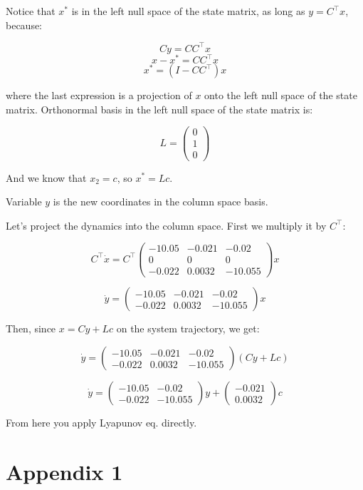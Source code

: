 \documentclass[12pt]{article}%
\begin{document}
Notice that $x^*$ is in the left null space of the state matrix, as long as $y = C^{\top}x$, because: 

$$Cy = CC^{\top}x$$
$$x-x^* = CC^{\top}x$$
$$x^* = (I-CC^{\top})x$$

where the last expression is a projection of $x$ onto the left null space of the state matrix. Orthonormal basis in the left null space of the state matrix is:

$$
L =
\begin{pmatrix} 
0 \\  
1 \\  
0
\end{pmatrix}
$$

And we know that $x_2 = c$, so $x^* = Lc$.

Variable $y$ is the new coordinates in the column space basis.

Let's project the dynamics into the column space. First we multiply it by $C^{\top}$:

$$C^{\top} \dot x = 
C^{\top}
\begin{pmatrix} -10.05 & -0.021 & -0.02 \\  
0 & 0 & 0 \\  
-0.022 & 0.0032 & -10.055
\end{pmatrix}
x
$$

$$\dot y = 
\begin{pmatrix} -10.05 & -0.021 & -0.02 \\ 
-0.022 & 0.0032 & -10.055
\end{pmatrix}
x
$$

Then, since $x = Cy + Lc$ on the system trajectory, we get:

$$\dot y = 
\begin{pmatrix} -10.05 & -0.021 & -0.02 \\ 
-0.022 & 0.0032 & -10.055
\end{pmatrix}
(Cy + Lc)
$$

$$\dot y = 
\begin{pmatrix} -10.05 & -0.02 \\ 
-0.022 & -10.055
\end{pmatrix}
y
+
\begin{pmatrix} 
-0.021 \\ 
0.0032
\end{pmatrix}
c
$$

From here you apply Lyapunov eq. directly.

\section{Appendix 1}
\end{document}
